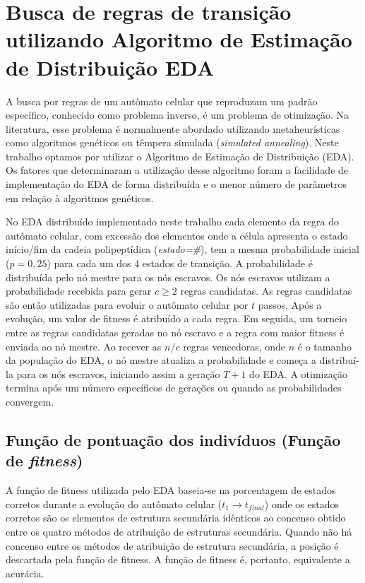 
\section{Busca de regras de transição utilizando Algoritmo de Estimação de Distribuição EDA}

A busca por regras de um autômato celular que reproduzam um padrão específico, conhecido como problema inverso, é um problema de otimização. Na literatura, esse problema é normalmente abordado utilizando metaheurísticas como algoritmos genéticos ou têmpera simulada (\textit{simulated annealing}). Neste trabalho optamos por utilizar o Algoritmo de Estimação de Distribuição (EDA). Os fatores que determinaram a utilização desse algoritmo foram a facilidade de implementação do EDA de forma distribuída e o menor número de parâmetros em relação à algoritmos genéticos.

No EDA distribuído implementado neste trabalho cada elemento da regra do autômato celular, com excessão dos elementos onde a célula apresenta o estado início/fim da cadeia polipeptídica (\textit{estado=\#}),  tem a mesma probabilidade inicial ($p=0,25$) para cada um dos 4 estados de transição. A probabilidade é distribuída pelo nó mestre para os nós escravos. Os nós escravos utilizam a probabilidade recebida para gerar $c \ge 2 $ regras candidatas. As regras candidatas são então utilizadas para evoluir o autômato celular por $t$ passos. Após a evolução, um valor de fitness é atribuído a cada regra. Em seguida, um torneio entre as regras candidatas geradas no nó escravo e a regra com maior fitness é enviada ao nó mestre. Ao recever as $n/c$ regras vencedoras, onde $n$ é o tamanho da população do EDA, o nó mestre atualiza a probabilidade e começa a distribuí-la para os nós escravos, iniciando assim a geração $T+1$ do EDA. A otimização termina após um número específicos de gerações ou quando as probabilidades convergem.

\subsection{Função de pontuação dos indivíduos (Função de \textit{fitness})}

A função de fitness utilizada pelo EDA baseia-se na porcentagem de estados corretos durante a evolução do autômato celular ($t_1 \rightarrow t_{final}$) onde os estados corretos são os elementos de estrutura secundária idênticos ao concenso obtido entre os quatro métodos de atribuição de estruturas secundária. Quando não há concenso entre os métodos de atribuição de estrutura secundária, a posição é descartada pela função de fitness. A função de fitness é, portanto, equivalente a acurácia.


